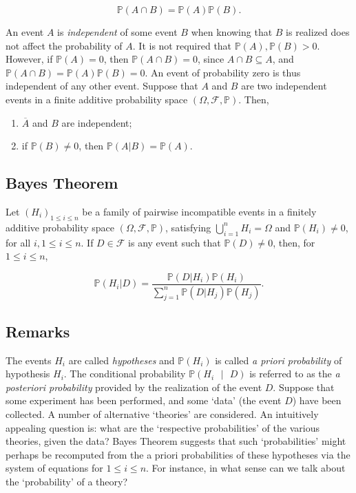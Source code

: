 \documentclass[12pt]{article}
\newcommand{\prob}[1]{\mathbb{P}(#1)}
\newcommand{\condprob}[2]{\mathbb{P}(#1 \text{ } \lvert \text{ } #2)}
\newcommand{\field}{\mathcal{F}}
\begin{document}
\begin{equation*}
\prob{A \cap B} = \prob{A}\prob{B}.
\end{equation*}

\noindent
An event $A$ is \textit{independent} of some event $B$ when knowing that $B$ is realized does not affect the probability of $A$. It is not required that $\prob{A}, \prob{B} > 0$. However, if $\prob{A} = 0$, then $\prob{A \cap B} = 0$, since $A \cap B \subseteq A$, and $\prob{A \cap B} = \prob{A}\prob{B} = 0$. An event of probability zero is thus independent of any other event. Suppose that $A$ and $B$ are two independent events in a finite additive probability space $(\Omega, \field, \mathbb{P})$. Then,

\begin{enumerate}[label=(\roman*)]
\item $\overline{A}$ and $B$ are independent;
\item if $\prob{B} \neq 0$, then $\prob{A \lvert B} = \prob{A}$.
\end{enumerate}

\subsection*{Bayes Theorem}
Let $(H_i)_{1 \leq i \leq n}$ be a family of pairwise incompatible events in a finitely additive probability space $(\Omega, \field, \mathbb{P})$, satisfying $\bigcup_{i=1}^{n} H_i = \Omega$ and $\prob{H_i} \neq 0$, for all $i, 1 \leq i \leq n$. If $D \in \field$ is any event such that $\prob{D} \neq 0$, then, for $1 \leq i \leq n$, 

\begin{equation*}
\prob{H_i \lvert D} = \frac{\prob{D \lvert H_i}\prob{H_i}}{\sum_{j=1}^{n} \prob{D \lvert H_j}\prob{H_j}}.
\end{equation*}

\subsection*{Remarks}
\noindent
The events $H_i$ are called \textit{hypotheses} and $\prob{H_i}$ is called \textit{a priori probability} of hypothesis $H_i$. The conditional probability $\condprob{H_i}{D}$ is referred to as the \textit{a posteriori probability} provided by the realization of the event $D$. Suppose that some experiment has been performed, and some `data' (the event $D$) have been collected. A number of alternative `theories' are considered. An intuitively appealing question is: what are the `respective probabilities' of the various theories, given the data? Bayes Theorem suggests that such `probabilities' might perhaps be recomputed from the a priori probabilities of these hypotheses via the system of equations for $1 \leq i \leq n$. For instance, in what sense can we talk about the `probability' of a theory? 
\end{document}
